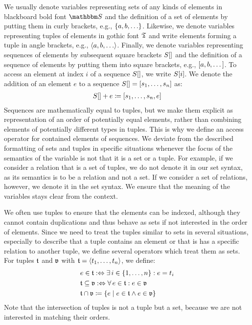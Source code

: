 We usually denote variables representing sets of any kinds of elements in blackboard bold font $\set{S}{}$ and the definition of a set of elements by putting them in curly brackets, e.g., $\setted{a, b, \dots}$.
Likewise, we denote variables representing tuples of elements in gothic font $\mathfrak{T}{}$ and write elements forming a tuple in angle brackets, e.g., $\tupled{a, b, \dots}$.
Finally, we denote variables representing sequences of elements by subsequent square brackets $S[]$ and the definition of a sequence of elements by putting them into square brackets, e.g., $[a, b, \dots]$.
To access an element at index $i$ of a sequence $S[]$, we write $S[i]$.
We denote the addition of an element $e$ to a sequence $S[] = [s_1, \dots, s_n]$ as:
\begin{align*}
    S[] + e \coloneqq [s_1, \dots, s_n, e]
\end{align*}
Sequences are mathematically equal to tuples, but we make them explicit as representation of an order of potentially equal elements, rather than combining elements of potentially different types in tuples. This is why we define an access operator for contained elements of sequences.
We deviate from the described formatting of sets and tuples in specific situations whenever the focus of the semantics of the variable is not that it is a set or a tuple.
For example, if we consider a relation that is a set of tuples, we do not denote it in our set syntax, as its semantics is to be a relation and not a set.
If we consider a set of relations, however, we denote it in the set syntax.
We ensure that the meaning of the variables stays clear from the context.

We often use tuples to ensure that the elements can be indexed, although they cannot contain duplications and thus behave as sets if not interested in the order of elements.
Since we need to treat the tuples similar to sets in several situations, especially to describe that a tuple contains an element or that is has a specific relation to another tuple, we define several operators which treat them as sets.
For tuples $\mathfrak{t}$ and $\mathfrak{v}$ with $\mathfrak{t}{} = \langle t_1, \dots, t_n \rangle$, we define:
\begin{align*}
    &
    e \in \tuple{t}{} \equivalentperdefinition \exists i \in \setted{1, \dots, n} : e = t_i \\
    &
    \tuple{t} \subseteq \tuple{v} \equivalentperdefinition \forall e \in \tuple{t} : e \in \tuple{v} \\
    &
    \tuple{t} \cap \tuple{v} \equalsperdefinition \setted{e \mid e \in \tuple{t} \land e \in \tuple{v}}
\end{align*}
Note that the intersection of tuples is not a tuple but a set, because we are not interested in matching their orders. %

